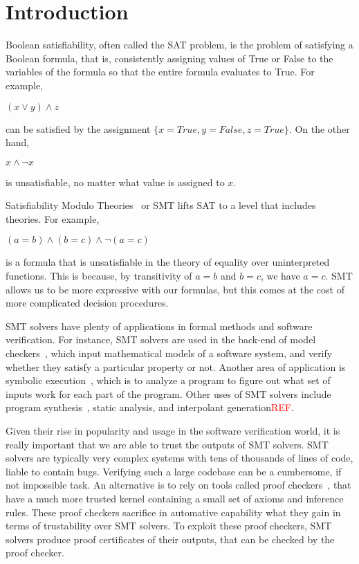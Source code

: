 \documentclass{article}
\begin{document}
\section{Introduction}
\label{sec:intro}
Boolean satisfiability, often called the SAT problem, 
is the problem of satisfying a Boolean formula, that is, 
consistently assigning values of True or False to the variables 
of the formula so that the entire formula evaluates to True. 
For example,
\begin{center}$(x \lor y) \land z$ \end{center}
can be satisfied by the 
assignment $\{x=True,y=False,z=True\}$. On the other hand, 
\begin{center} $x \land \neg x$ \end{center}
is unsatisfiable, no matter what value is assigned to $x$.

Satisfiability Modulo Theories~\cite{DBLP:reference/mc/BarrettT18} 
or SMT lifts SAT to a level that includes theories. 
For example, 
\begin{center} $(a = b) \land (b = c) \land \neg (a = c)$ 
\end{center}
is a formula that is unsatisfiable in the theory of 
equality over uninterpreted functions. This is because, by
transitivity of $a = b$ and $b = c$, we have $a = c$. SMT 
allows us to be more expressive with our formulas, but 
this comes at the cost of more complicated decision 
procedures.

SMT solvers have plenty of applications in formal methods 
and software verification. For instance, SMT solvers are used 
in the back-end of model checkers~\cite{DBLP:books/daglib/0020348}, 
which input mathematical 
models of a software system, and verify whether they 
satisfy a particular property or not. Another area of 
application is symbolic
execution~\cite{DBLP:journals/csur/BaldoniCDDF18}, 
which is to analyze a 
program to figure out what set of inputs work for each 
part of the program. Other uses of SMT solvers include 
program synthesis~\cite{synth}, static analysis, 
and interpolant generation\textcolor{red}{REF}.

Given their rise in popularity and usage in the software 
verification world, it is really important that we are able 
to trust the outputs of SMT solvers. SMT solvers are typically 
very complex systems with tens of thousands of lines of code, 
liable to contain bugs. Verifying such a large codebase can 
be a cumbersome, if not impossible task. An alternative is 
to rely on tools called proof checkers~\cite{proofasst}, 
that have a much more trusted kernel containing a small 
set of axioms and inference rules. These proof checkers 
sacrifice in automative capability what they gain in terms 
of trustability over SMT solvers. To exploit these proof 
checkers, SMT solvers produce proof certificates of their 
outputs, that can be checked by the proof checker.
\end{document}
